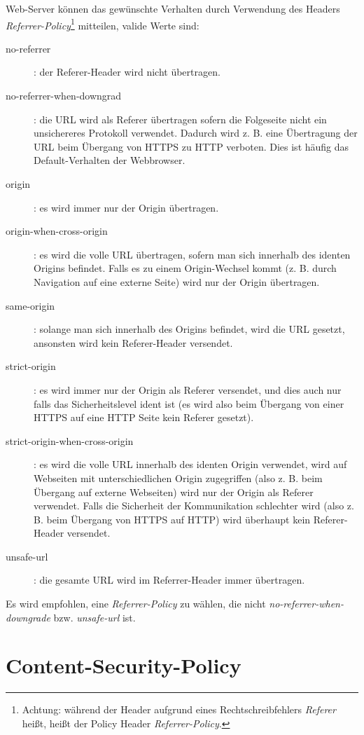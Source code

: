 Web-Server können das gewünschte Verhalten durch Verwendung des Headers \textit{Referrer-Policy}\footnote{Achtung: während der Header aufgrund eines Rechtschreibfehlers \textit{Referer} heißt, heißt der Policy Header \textit{Referrer-Policy}.} mitteilen, valide Werte sind:

\begin{description}
	\item[no-referrer]: der Referer-Header wird nicht übertragen.
	\item[no-referrer-when-downgrad]: die URL wird als Referer übertragen sofern die Folgeseite nicht ein unsichereres Protokoll verwendet. Dadurch wird z. B. eine Übertragung der URL beim Übergang von HTTPS zu HTTP verboten. Dies ist häufig das Default-Verhalten der Webbrowser.
	\item[origin]: es wird immer nur der Origin übertragen.
	\item[origin-when-cross-origin]: es wird die volle URL übertragen, sofern man sich innerhalb des identen Origins befindet. Falls es zu einem Origin-Wechsel kommt (z. B. durch Navigation auf eine externe Seite) wird nur der Origin übertragen.
	\item[same-origin]: solange man sich innerhalb des Origins befindet, wird die URL gesetzt, ansonsten wird kein Referer-Header versendet.
	\item[strict-origin]: es wird immer nur der Origin als Referer versendet, und dies auch nur falls das Sicherheitslevel ident ist (es wird also beim Übergang von einer HTTPS auf eine HTTP Seite kein Referer gesetzt).
	\item[strict-origin-when-cross-origin]: es wird die volle URL innerhalb des identen Origin verwendet, wird auf Webseiten mit unterschiedlichen Origin zugegriffen (also z. B. beim Übergang auf externe Webseiten) wird nur der Origin als Referer verwendet. Falls die Sicherheit der Kommunikation schlechter wird (also z. B. beim Übergang von HTTPS auf HTTP) wird überhaupt kein Referer-Header versendet.
	\item[unsafe-url]: die gesamte URL wird im Referrer-Header immer übertragen.
\end{description}

Es wird empfohlen, eine \textit{Referrer-Policy} zu wählen, die nicht \textit{no-referrer-when-downgrade} bzw. \textit{unsafe-url} ist.

\section{Content-Security-Policy}
\label{csp}

